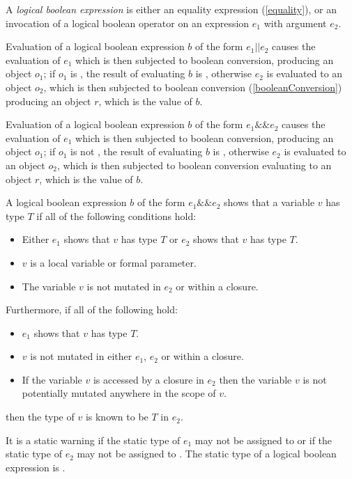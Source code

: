 \documentclass{article}
\begin{document}
\LMHash{}
A {\em logical boolean expression} is either an equality expression (\ref{equality}), or an invocation of a logical boolean operator on an expression $e_1$ with argument $e_2$.

\LMHash{}
Evaluation of a logical boolean expression $b$ of the form $e_1 || e_2$ causes the evaluation of $e_1$ which is then subjected to boolean conversion, producing an object $o_1$; if $o_1$ is \TRUE, the result of evaluating $b$ is \TRUE, otherwise $e_2$ is evaluated to an object $o_2$, which is then subjected to boolean conversion (\ref{booleanConversion}) producing an object $r$, which is the value of $b$.

\LMHash{}
Evaluation of a logical boolean expression $b$ of the form $e_1 \&\& e_2$ causes the evaluation of $e_1$ which is then subjected to boolean conversion, producing an object $o_1$; if $o_1$ is not \TRUE, the result of evaluating $b$ is \FALSE, otherwise $e_2$ is evaluated to an object $o_2$, which is then subjected to boolean conversion evaluating to an object $r$, which is the value of $b$.

\LMHash{}
A logical boolean expression $b$ of the form $e_1 \&\& e_2$ shows that a variable $v$ has type
$T$ if all of the following conditions hold:
\begin{itemize}
\item Either $e_1$ shows that $v$ has type $T$ or $e_2$ shows that $v$ has type $T$.
\item $v$ is a local variable or formal parameter.
\item The variable $v$ is not mutated in $e_2$ or within a closure.
\end{itemize}

\LMHash{}
Furthermore, if all of the following hold:
\begin{itemize}
\item $e_1$ shows that $v$ has type $T$.
\item $v$ is not mutated in either $e_1$, $e_2$ or within a closure.
\item If the variable $v$ is accessed by a closure in $e_2$ then the variable $v$ is not potentially mutated anywhere in the scope of $v$.
\end{itemize}
then the type of $v$ is known to be $T$ in $e_2$.

\LMHash{}
It is a static warning if the static type of $e_1$ may not be assigned to  or if the static type of $e_2$ may not be assigned to .
The static type of a logical boolean expression is .
\end{document}

